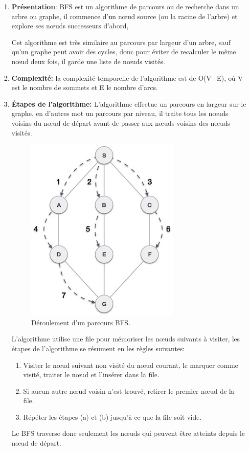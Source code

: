\begin{enumerate}
	\item \textbf{Présentation}: BFS\cite{refBFS} est un algorithme de parcours ou de recherche dans un arbre ou graphe, il commence d'un nœud source (ou la racine de l'arbre) et explore ses nœuds successeurs d'abord, 

Cet algorithme est très similaire au parcours par largeur d'un arbre, sauf qu'un graphe peut avoir des cycles, donc pour éviter de recalculer le même nœud deux fois, il garde une liste de nœuds visités.

	\item \textbf{Complexité:} la complexité temporelle de l'algorithme est de O(V+E), où V est le nombre de sommets et E le nombre d'arcs.
	
	\item \textbf{Étapes de l'algorithme:}
		L'algorithme effectue un parcours en largeur sur le graphe, en d'autres mot un parcours par niveau, il traite tous les nœuds voisins du nœud de départ avant de passer aux nœuds voisins des nœuds visités.
\begin{figure}
	\center
	\includegraphics[scale=0.6]{img/BFS.jpg}
	\caption{Déroulement d'un parcours BFS.}
\end{figure}		
L'algorithme utilise une file pour mémoriser les nœuds suivants à visiter, les étapes de l'algorithme se résument en les règles suivantes:
	\begin{enumerate}
		\item Visiter le nœud suivant non visité du nœud courant, le marquer comme visité, traiter le nœud et l'insérer dans la file.
		\item Si aucun autre nœud voisin n'est trouvé, retirer le premier nœud de la file.
		\item Répéter les étapes (a) et (b) jusqu'à ce que la file soit vide.
	\end{enumerate}
	Le BFS traverse donc seulement les nœuds qui peuvent être atteints depuis le nœud de départ.
\end{enumerate}

